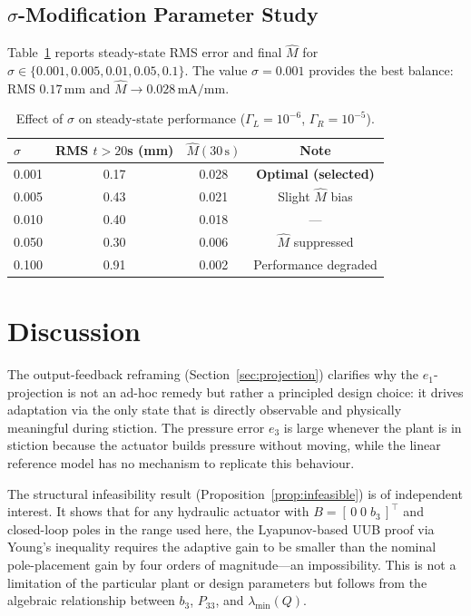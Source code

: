 \documentclass[12pt,a4paper]{article}
\theoremstyle{plain}
\theoremstyle{definition}
\theoremstyle{remark}
\newcommand{\Mh}{\hat{M}}       %
\newcommand{\GL}{\Gamma_L}
\newcommand{\GR}{\Gamma_R}
\begin{document}
\subsection{$\sigma$-Modification Parameter Study}

Table~\ref{tab:sigma} reports steady-state RMS error and final $\Mh$
for $\sigma\in\{0.001,0.005,0.01,0.05,0.1\}$.  The value
$\sigma=0.001$ provides the best balance: RMS $0.17\,\mathrm{mm}$ and
$\Mh\to 0.028\,\mathrm{mA/mm}$.

\begin{table}[htbp]
\centering
\caption{Effect of $\sigma$ on steady-state performance
         ($\GL=10^{-6}$, $\GR=10^{-5}$).}
\label{tab:sigma}
\begin{tabular}{lccc}
\toprule
$\sigma$ & RMS $t{>}20$s (mm) & $\hat M(30\,\mathrm{s})$ & Note \\
\midrule
0.001 & 0.17 & 0.028 & \textbf{Optimal (selected)} \\
0.005 & 0.43 & 0.021 & Slight $\hat M$ bias \\
0.010 & 0.40 & 0.018 & --- \\
0.050 & 0.30 & 0.006 & $\hat M$ suppressed \\
0.100 & 0.91 & 0.002 & Performance degraded \\
\bottomrule
\end{tabular}
\end{table}

\section{Discussion}
\label{sec:discussion}

The output-feedback reframing (Section~\ref{sec:projection}) clarifies
why the $e_1$-projection is not an ad-hoc remedy but rather a
principled design choice: it drives adaptation via the only state that
is directly observable and physically meaningful during stiction.  The
pressure error $e_3$ is large whenever the plant is in stiction
because the actuator builds pressure without moving, while the linear
reference model has no mechanism to replicate this behaviour.

The structural infeasibility result (Proposition~\ref{prop:infeasible})
is of independent interest.  It shows that for any hydraulic actuator
with $B=[\,0\;0\;b_3\,]^\top$ and closed-loop poles in the range used
here, the Lyapunov-based UUB proof via Young's inequality requires the
adaptive gain to be smaller than the nominal pole-placement gain by
four orders of magnitude---an impossibility.  This is not a limitation
of the particular plant or design parameters but follows from the
algebraic relationship between $b_3$, $P_{33}$, and $\lambda_{\min}(Q)$.
\end{document}
